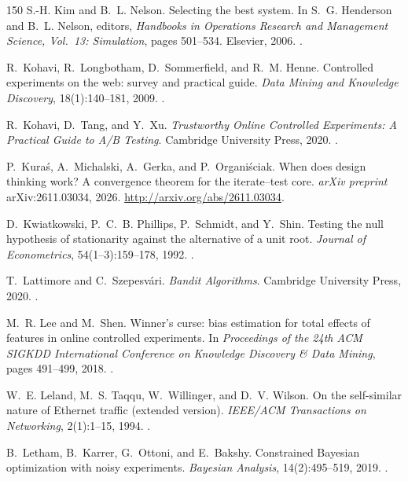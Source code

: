 \begin{thebibliography}{150}
S.-H. Kim and B.~L. Nelson. Selecting the best system. In S.~G. Henderson and B.~L. Nelson, editors, \emph{Handbooks in Operations Research and Management Science, Vol.~13: Simulation}, pages 501--534. Elsevier, 2006. .

R.~Kohavi, R.~Longbotham, D.~Sommerfield, and R.~M. Henne. Controlled experiments on the web: survey and practical guide. \emph{Data Mining and Knowledge Discovery}, 18(1):140--181, 2009. .

R.~Kohavi, D.~Tang, and Y.~Xu. \emph{Trustworthy Online Controlled Experiments: A Practical Guide to A/B Testing}. Cambridge University Press, 2020. .

P.~Kura{\'s}, A.~Michalski, A.~Gerka, and P.~Organi{\'s}ciak. When does design thinking work? A convergence theorem for the iterate--test core. \emph{arXiv preprint} arXiv:2611.03034, 2026. \url{http://arxiv.org/abs/2611.03034}.

D.~Kwiatkowski, P.~C.~B. Phillips, P.~Schmidt, and Y.~Shin. Testing the null hypothesis of stationarity against the alternative of a unit root. \emph{Journal of Econometrics}, 54(1--3):159--178, 1992. .

T.~Lattimore and C.~Szepesv{\'a}ri. \emph{Bandit Algorithms}. Cambridge University Press, 2020. .

M.~R. Lee and M.~Shen. Winner's curse: bias estimation for total effects of features in online controlled experiments. In \emph{Proceedings of the 24th ACM SIGKDD International Conference on Knowledge Discovery \& Data Mining}, pages 491--499, 2018. .

W.~E. Leland, M.~S. Taqqu, W.~Willinger, and D.~V. Wilson. On the self-similar nature of Ethernet traffic (extended version). \emph{IEEE/ACM Transactions on Networking}, 2(1):1--15, 1994. .

B.~Letham, B.~Karrer, G.~Ottoni, and E.~Bakshy. Constrained Bayesian optimization with noisy experiments. \emph{Bayesian Analysis}, 14(2):495--519, 2019. .


\end{thebibliography}
